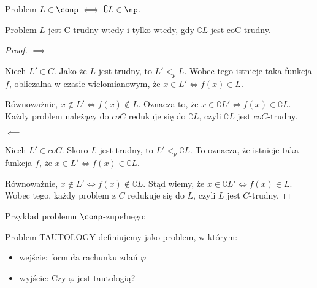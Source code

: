 \begin{definition}
    Problem \(  L \in  \conp \iff \complement{L} \in \np \).
\end{definition}

\begin{lemma}
    Problem \( L \) jest C-trudny wtedy i tylko wtedy, gdy \( \complement{L} \) jest  coC-trudny. 
\end{lemma}
\begin{proof}
    \( \implies \)
        
    Niech \( L' \in C\). Jako że \(L\) jest trudny, to \(L' <_{p} L\).  Wobec tego istnieje taka funkcja \(f\), obliczalna w czasie wielomianowym, że \( x \in L' \iff f(x) \in L\).
    
    Równoważnie, \( x \not\in L' \iff f(x) \not \in L\). Oznacza to, że \( x \in \complement{L'} \iff f(x) \in \complement{L}\). Każdy problem należący do \(coC\) redukuje się do \( \complement{L} \), czyli \(\complement{L}\) jest \(coC\)-trudny.

    \( \impliedby \)
        
    Niech \( L' \in coC\). Skoro \(L\) jest trudny, to \(L' <_{p} \complement{L}\). To oznacza, że istnieje taka funkcja \(f\), że \( x \in L' \iff f(x) \in \complement{L} \). 
        
    Równoważnie, \( x \not \in L' \iff f(x) \not \in \complement{L} \). Stąd wiemy, że \( x \in \complement{L'} \iff f(x) \in L \). Wobec tego, każdy problem z \(C\) redukuje się do \(L\), czyli \(L\) jest \(C\)-trudny. 
\end{proof}


Przykład problemu \(\conp\)-zupełnego:
\begin{definition}
    Problem \textsc{TAUTOLOGY} definiujemy jako problem, w którym:
    \begin{itemize}
        \item wejście: formuła rachunku zdań \( \varphi \)
        \item wyjście: Czy \( \varphi \) jest tautologią?
    \end{itemize}
\end{definition}

